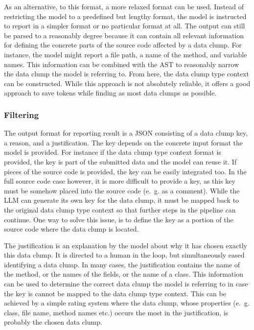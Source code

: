 As an alternative, to this format, a more relaxed format can be used. Instead of restricting the model to a predefined but lengthy format, the model is instructed to report in a simpler format or no particular format at all. The output can still be parsed to a reasonably degree because it can contain all relevant information for defining the concrete parts of the source code affected by a data clump. For instance, the model might report a file path, a name of the method, and variable names. This information can be combined with the \ac{AST} to reasonably narrow the data clump the model is referring to. From here, the data clump type context can be constructed. While this approach is not absolutely reliable, it offers a good approach to save tokens while finding as most data clumps as possible. 

\subsubsection{Filtering}\label{sec:output_format_filtering}
 The output format for reporting result is a \ac{JSON}  consisting of a data clump key, a reason, and a justification. The key depends on the concrete input format the model is provided. For instance if the data clump type context format is provided, the key is part of the submitted data and the model can reuse it. If pieces of the source code is provided, the key can be easily integrated too. In the full source code case however, it is more difficult to provide a key, as this key must be somehow placed into the source code (e.~g. as a comment). While the \ac{LLM} can generate its own key for the data clump, it must be mapped back to the original data clump type context so that further steps in the pipeline can continue. One way to solve this issue, is to define the key as a portion of the source code where the data clump is located. 

 The justification is an explanation by the model about why it has chosen exactly this data clump. It is directed to a human in the loop, but simultaneously eased identifying a data clump. In many cases, the justification contains the name of the method, or the names of the fields, or the name of a class. This information can be used to determine the correct data clump the model is referring to in case the key is cannot be mapped to the  data clump type context. This can be achieved by a simple rating system where the data clump, whose properties (e.~g. class, file name, method names etc.) occurs the most in the justification, is probably the chosen data clump. 

